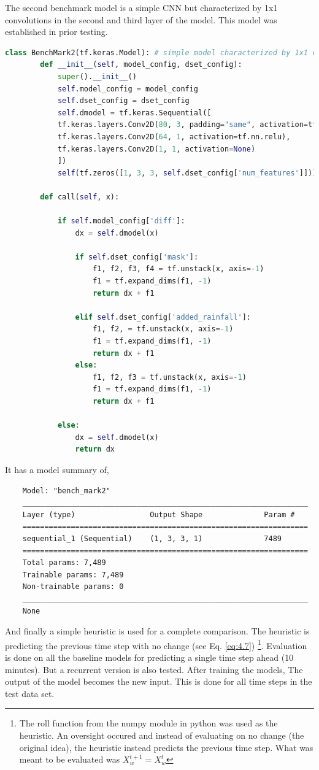 The second benchmark model is a simple CNN but characterized by 1x1 convolutions in the second and third layer of the model. This model was established in prior testing.

\begin{lstlisting}[language=Python, label={lst:7}]
	class BenchMark2(tf.keras.Model): # simple model characterized by 1x1 convolutions
		def __init__(self, model_config, dset_config):
			super().__init__()
			self.model_config = model_config
			self.dset_config = dset_config
			self.dmodel = tf.keras.Sequential([
			tf.keras.layers.Conv2D(80, 3, padding="same", activation=tf.nn.relu),
			tf.keras.layers.Conv2D(64, 1, activation=tf.nn.relu),
			tf.keras.layers.Conv2D(1, 1, activation=None)
			])
			self(tf.zeros([1, 3, 3, self.dset_config['num_features']]))
		
		def call(self, x):
		
			if self.model_config['diff']:
				dx = self.dmodel(x)
				
				if self.dset_config['mask']:
					f1, f2, f3, f4 = tf.unstack(x, axis=-1)
					f1 = tf.expand_dims(f1, -1)
					return dx + f1
				
				elif self.dset_config['added_rainfall']:
					f1, f2, = tf.unstack(x, axis=-1)
					f1 = tf.expand_dims(f1, -1)
					return dx + f1
				else:
					f1, f2, f3 = tf.unstack(x, axis=-1)
					f1 = tf.expand_dims(f1, -1)
					return dx + f1
			
			else:
				dx = self.dmodel(x)
				return dx
\end{lstlisting}

It has a model summary of,
\begin{verbatim}
	Model: "bench_mark2"
	_________________________________________________________________
	Layer (type)                 Output Shape              Param #   
	=================================================================
	sequential_1 (Sequential)    (1, 3, 3, 1)              7489      
	=================================================================
	Total params: 7,489
	Trainable params: 7,489
	Non-trainable params: 0
	_________________________________________________________________
	None
\end{verbatim}


And finally a simple heuristic is used for a complete comparison. The heuristic is predicting the previous time step with no change (see Eq. \ref{eq:4.7}) \footnote{The roll function from the numpy module in python was used as the heuristic. An oversight occured and instead of evaluating on no change (the original idea), the heuristic instead predicts the previous time step. What was meant to be evaluated was $X_{w}^{t+1} = X_{w}^{t}$}. Evaluation is done on all the baseline models for predicting a single time step ahead (10 minutes). But a recurrent version is also tested. After training the models, The output of the model becomes the new input. This is done for all time steps in the test data set.

